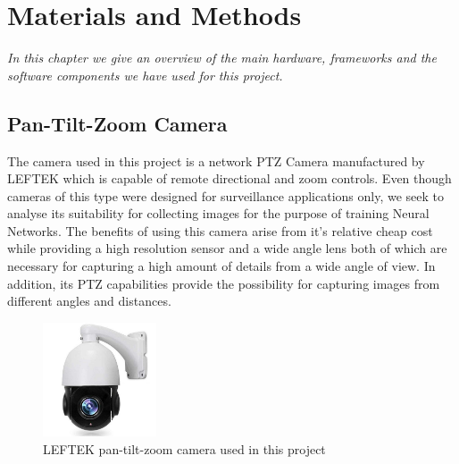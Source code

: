 \documentclass{l4proj}
\begin{document}
\chapter{Materials and Methods}

\textit{In this chapter we give an overview of the main hardware, frameworks and the software components we have used for this project.}




\section{Pan-Tilt-Zoom Camera} 

The camera used in this project is a network PTZ Camera manufactured by LEFTEK which is capable of remote directional and zoom controls. Even though cameras of this type were designed for surveillance applications only, we seek to analyse its suitability for collecting images for the purpose of training Neural Networks. The benefits of using this camera arise from it's relative cheap cost while providing a high resolution sensor and a wide angle lens both of which are necessary for capturing a high amount of details from a wide angle of view. In addition, its PTZ capabilities provide the possibility for capturing images from different angles and distances. 





\begin{figure}[ht]
    \centering
    \includegraphics[width=0.3\textwidth]{l4template-master/images/ptzCamera.jpg}
    \caption{LEFTEK pan-tilt-zoom camera used in this project}
    \label{ptzCamera}
\end{figure}
\end{document}

